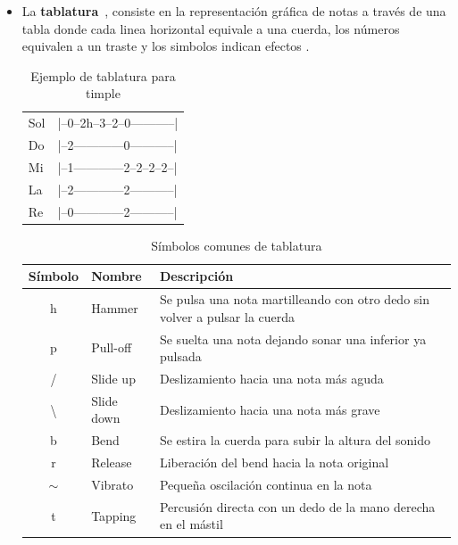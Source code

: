 \begin{itemize}
    \item La \textbf{\gls{tablatura}}~\cite{wikipedia_tablatura}, consiste en la representación gráfica de notas a través de una tabla  donde cada linea horizontal equivale a una cuerda, los números equivalen a un traste y los simbolos indican efectos .
    
    \begin{table}[H]
        \centering
        \scriptsize
        \caption{Ejemplo de tablatura para timple}\label{fig:tablatura}
        \ttfamily
        \begin{tabular}{l l}
            Sol & |--0--2h--3--2--0-----------| \\
            Do  & |--2------------0-----------| \\
            Mi  & |--1------------2--2--2--2--| \\
            La  & |--2------------2-----------| \\
            Re  & |--0------------2-----------| \\
        \end{tabular}
    \end{table}

    \begin{table}[H]
        \centering
        \scriptsize
        \caption{Símbolos comunes de tablatura}\label{tab:simbolos_tablatura}
        \begin{tabular}{c l l}
            \hline
            \textbf{Símbolo} & \textbf{Nombre} & \textbf{Descripción} \\
            \hline
            h & Hammer & Se pulsa una nota martilleando con otro dedo sin volver a pulsar la cuerda \\
            p & Pull-off & Se suelta una nota dejando sonar una inferior ya pulsada \\
            / & Slide up & Deslizamiento hacia una nota más aguda \\
            \textbackslash & Slide down & Deslizamiento hacia una nota más grave \\
            b & Bend & Se estira la cuerda para subir la altura del sonido \\
            r & Release & Liberación del bend hacia la nota original \\
            $\sim$ & Vibrato & Pequeña oscilación continua en la nota \\
            t & Tapping & Percusión directa con un dedo de la mano derecha en el mástil \\
            \hline
        \end{tabular}
    \end{table}


\end{itemize}
